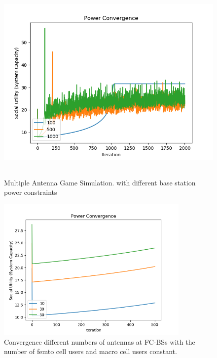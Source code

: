 \documentclass[12pt,a4paper]{report}
\begin{document}
\begin{figure}[H]
	\includegraphics[width=\textwidth,height = 10cm]{figures/multiple_antenna}
	  \caption{Multiple Antenna Game Simulation. with different base station power constraints}
\end{figure}


\begin{figure}[H]
	  	\includegraphics[width=\textwidth,height = 7cm]{figures/increasing_antenna}
	  		  \caption{Convergence different numbers of antennas at FC-BSs with the number of femto cell users and macro cell users constant.}
	  \label{fig:}
\end{figure}
\end{document}

